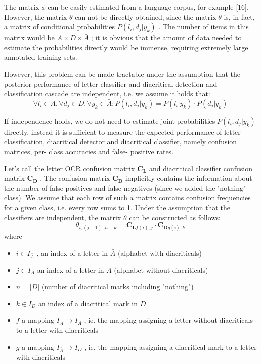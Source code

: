 \documentclass[12pt,a4paper]{report}
\begin{document}
The matrix $\phi$ can be easily estimated from a language corpus, for example [16]. However, the matrix $\theta$ can not be directly obtained, since the matrix $\theta$ is, in fact, a matrix of conditional probabilities $P(l_i,d_j|y_k)$ . The number of items in this matrix would be $A\times D\times \bar{A}$ ; it is obvious that the amount of data needed to estimate the probabilities directly would be immense, requiring extremely large annotated training sets.

However, this problem can be made tractable under the assumption that the posterior performance of letter classifier and diacritical detection and classification cascade are independent, i.e. we assume it holds that:
\[
\forall l_i\in A,\forall d_j\in D,\forall y_k\in \bar{A}:P(l_i,d_j|y_k) = P(l_i|y_k)\cdot P(d_j|y_k)
\]

If independence holds, we do not need to estimate joint probabilities $P(l_i,d_j|y_k)$ directly, instead it is sufficient to measure the expected performance of letter classification, diacritical detector and diacritical classifier, namely confusion matrices, per- class accuracies and false- positive rates.

Let's call the letter OCR confusion matrix $\mathbf{C}_{\mathbf{L}}$ and diacritical classifier confusion matrix $\mathbf{C}_{\mathbf{D}}$ . The confusion matrix $\mathbf{C}_{\mathbf{D}}$ implicitly contains the information about the number of false positives and false negatives (since we added the "nothing" class). We assume that each row of such a matrix contains confusion frequencies for a given class, i.e. every row sums to 1. Under the assumption that the classifiers are independent, the matrix $\theta$ can be constructed as follows:
\[
\theta_{i,(j - 1)\cdot n + k} = \mathbf{C}_{\mathbf{L}f(i),j}\cdot \mathbf{C}_{\mathbf{D}g(i),k}
\]
where
\begin{itemize}
    \item $i \in I_{\bar{A}}$ , an index of a letter in $\bar{A}$ (alphabet with diacriticals)
    \item $j \in I_{A}$ an index of a letter in $A$ (alphabet without diacriticals)
    \item $n = |D|$ (number of diacritical marks including "nothing")
    \item $k \in I_{D}$ an index of a diacritical mark in $D$
    \item $f$ a mapping $I_{\bar{A}}\rightarrow I_{A}$ , ie. the mapping assigning a letter without diacriticals to a letter with diacriticals
    \item $g$ a mapping $I_{\bar{A}}\rightarrow I_{D}$ , ie. the mapping assigning a diacritical mark to a letter with diacriticals
\end{itemize}
\end{document}

